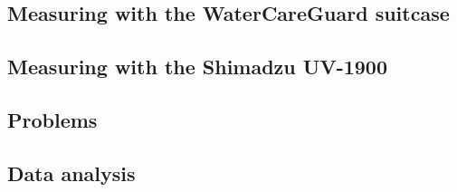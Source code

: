 \subsection{Measuring with the WaterCareGuard suitcase}
\subsection{Measuring with the Shimadzu UV-1900}
\subsection{Problems}
\subsection{Data analysis}